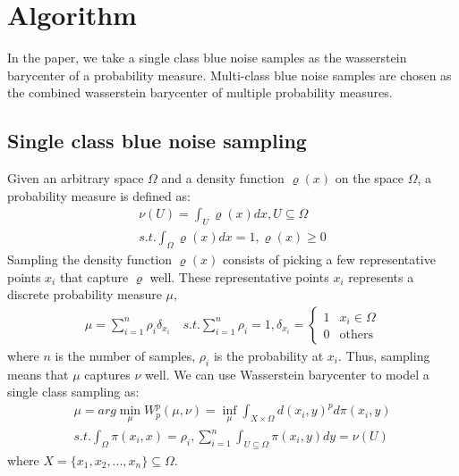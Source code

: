 \section{Algorithm}

In the paper,
we take a single class blue noise samples  as the wasserstein barycenter of a probability measure.
Multi-class blue noise samples are chosen as the combined wasserstein barycenter of multiple probability measures.
\subsection{Single class blue noise sampling}
Given an arbitrary space $\Omega$ and a density function $\varrho(x)$ on the space $\Omega$,
a probability measure is defined as:
\begin{equation}\label{probability-measure}
  \begin{split}
  \nu(U)=\int_U\varrho(x)dx, U\subseteq\Omega \\
  s.t. \int_{\Omega}\varrho(x)dx=1,\varrho(x)\geq0
  \end{split}
\end{equation}
Sampling the density function $\varrho(x)$ consists of picking a few representative points $x_i$
that capture $\varrho$ well.
These representative points $x_i$ represents a discrete probability measure $\mu$,
\begin{equation*}
\begin{split}
  \mu=\sum\limits_{i=1}^n\rho_i\delta_{x_i} \quad
  s.t. \sum\limits_{i=1}^n\rho_i=1,  \delta_{x_i}= \left\{ \begin{array}{ll}
  1 & x_i\in\Omega\\
  0 & \textrm{others}
  \end{array} \right.
  \end{split}
\end{equation*}
where $n$ is the number of samples,
$\rho_i$ is the probability at $x_i$.
Thus,
sampling means that $\mu$ captures $\nu$ well.
We can use Wasserstein barycenter to model a single class sampling as:
\begin{equation}\label{single-class-problem}
\begin{split}
 \mu=arg\min\limits_\mu W_p^p(\mu,\nu)=\inf\limits_\mu\int_{X\times\Omega}d(x_i,y)^pd\pi(x_i,y)\\
 s.t. \int_\Omega\pi(x_i,x)=\rho_i, \sum\limits_{i=1}^n\int_{U\subseteq\Omega}\pi(x_i,y)dy=\nu(U)
 \end{split}
\end{equation}
where $X=\{x_1,x_2,...,x_n\}\subseteq\Omega$.

